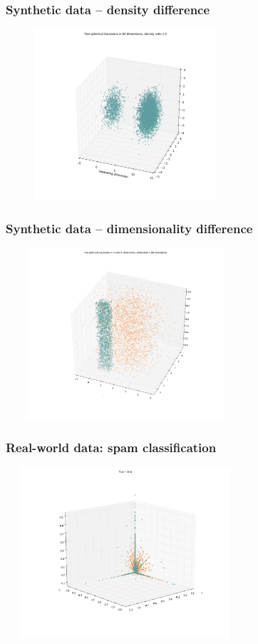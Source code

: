 \documentclass{beamer}
\begin{document}
\begin{frame}
\frametitle{Synthetic data -- density difference}
\centering
\includegraphics[width=3.5in,height=2.5in]{./fig/gaussian_illustration.png}
\end{frame}

\begin{frame}
\frametitle{Synthetic data -- dimensionality difference}
\centering
\includegraphics[width=3.5in,height=2.5in]{./fig/priya_illustration.png}
\end{frame}

\begin{frame}
\frametitle{Real-world data: spam classification}
\centering
\includegraphics[width=3.5in,height=2.5in]{./fig/spam_illustration.png}
\end{frame}
\end{document}
